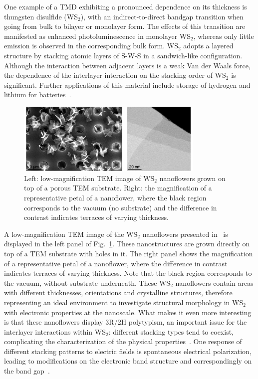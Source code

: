 One example of a TMD exhibiting a pronounced dependence on its thickness is 
thungsten disulfide (WS$_2$), with an indirect-to-direct bandgap transition when going
from bulk to bilayer or monolayer form.
%
The effects of this transition are manifested as enhanced
photoluminescence in monolayer WS$_2$, whereas only little emission is observed in
the corresponding bulk form.
%
WS$_2$ adopts a layered structure by stacking atomic layers of S-W-S 
in a sandwich-like configuration. 
%
Although the interaction between adjacent layers is a weak Van der Waals 
force, the dependence of the interlayer interaction on the stacking 
order of WS$_2$ is significant.
%
Further applications of this material include storage of hydrogen 
and lithium for batteries~\cite{Bhandavat:2012}.

\begin{figure}[h]
    \centering
    \includegraphics[width=0.8\textwidth]{plots/spectrumimage.pdf}
    \caption{Left: low-magnification TEM image of WS$_2$ nanoflowers
      grown on top of a porous TEM substrate. Right: the magnification of a representative 
      petal of a nanoflower, where the black region corresponds to 
      the vacuum (no substrate) and the difference in contrast indicates terraces of varying thickness.}
    \label{fig:nanoflowers}
\end{figure}

A low-magnification TEM image of the WS$_2$ nanoflowers presented in~\cite{SabryaWS2} is displayed
in the left panel of Fig.~\ref{fig:nanoflowers}.
%
These nanostructures are grown directly on top of a TEM substrate with holes in it. 
%
The right panel shows the magnification of a representative petal of a nanoflower,
where the difference in contrast indicates terraces of varying thickness.
%
Note that the black region corresponds to the vacuum, without
substrate underneath.
%
These WS$_2$ nanoflowers contain areas with different thicknesses, orientations
and crystalline structures, therefore representing an ideal environment to investigate
structural morphology in WS$_2$ with electronic properties at the nanoscale.
%
What makes it even more interesting is that these nanoflowers display 3R/2H polytypism, 
an important issue for the interlayer
 interactions within WS$_2$: different stacking types tend to coexist, 
 complicating the characterization of the physical properties~\cite{Na:2018}.
%
One response of different stacking patterns to electric fields is
 spontaneous electrical polarization, leading to modifications on the 
 electronic band structure and correspondingly on the band gap~\cite{Li:2016}.

